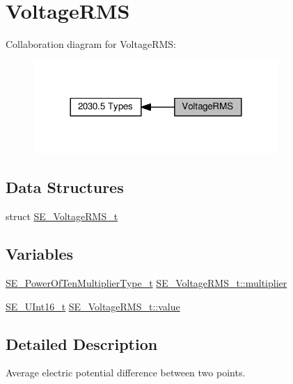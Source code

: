 \hypertarget{group__VoltageRMS}{}\section{Voltage\+R\+MS}
\label{group__VoltageRMS}
Collaboration diagram for Voltage\+R\+MS\+:\nopagebreak
\begin{figure}[H]
\begin{center}
\leavevmode
\includegraphics[width=264pt]{group__VoltageRMS}
\end{center}
\end{figure}
\subsection*{Data Structures}
\begin{DoxyCompactItemize}
\item 
struct \hyperlink{structSE__VoltageRMS__t}{S\+E\+\_\+\+Voltage\+R\+M\+S\+\_\+t}
\end{DoxyCompactItemize}
\subsection*{Variables}
\begin{DoxyCompactItemize}
\item 
\hyperlink{group__PowerOfTenMultiplierType_gaf0317b781dc8dbb9cb6ac4e44a14fdef}{S\+E\+\_\+\+Power\+Of\+Ten\+Multiplier\+Type\+\_\+t} \hyperlink{group__VoltageRMS_gad05e5d9b4adf6e1b04defeeaed1f694e}{S\+E\+\_\+\+Voltage\+R\+M\+S\+\_\+t\+::multiplier}
\item 
\hyperlink{group__UInt16_gac68d541f189538bfd30cfaa712d20d29}{S\+E\+\_\+\+U\+Int16\+\_\+t} \hyperlink{group__VoltageRMS_ga2b0cd2e5e58cc778f67c6dc0ed78f672}{S\+E\+\_\+\+Voltage\+R\+M\+S\+\_\+t\+::value}
\end{DoxyCompactItemize}


\subsection{Detailed Description}
Average electric potential difference between two points. 

